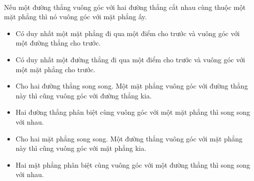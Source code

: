\documentclass[12pt,a4paper]{extarticle}
\newcommand{\bluecheck}{\textcolor{myblue}{\checkmark}}
\begin{document}
\vspace{0.4cm}
\noindent\textbf{\color{myblue}{b) Dấu hiệu nhận biết}}\\
Nếu một đường thẳng vuông góc với hai đường thẳng cắt nhau cùng thuộc một mặt phẳng thì nó vuông góc với mặt phẳng ấy.\\
\noindent\textbf{\color{myblue}{c) Tính chất}}
\begin{itemize}
	\item[\bluecheck] Có duy nhất một mặt phẳng đi qua một điểm cho trước và vuông góc với một đường thẳng cho trước.
	\item[\bluecheck] Có duy nhất một đường thẳng đi qua một điểm cho trước và vuông góc với một mặt phẳng cho trước.
	\item[\bluecheck] Cho hai đường thẳng song song. Một mặt phẳng vuông góc với đường thẳng này thì cũng vuông góc với đường thẳng kia.
	\item[\bluecheck] Hai đường thẳng phân biệt cùng vuông góc với một mặt phẳng thì song song với nhau.
	\item[\bluecheck] Cho hai mặt phẳng song song. Một đường thẳng vuông góc với mặt phẳng này thì cũng vuông góc với mặt phẳng kia.
	\item[\bluecheck] Hai mặt phẳng phân biệt cùng vuông góc với một đường thẳng thì song song với nhau.
\end{itemize}
\end{document}
